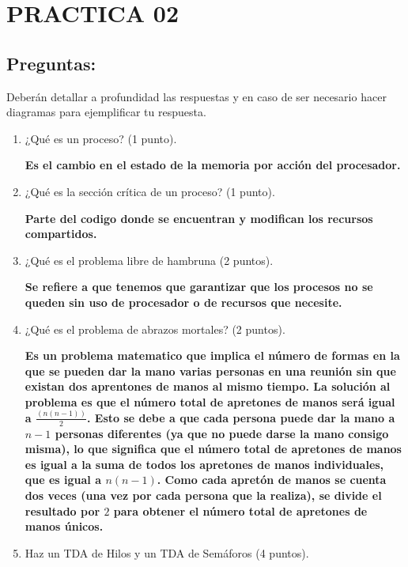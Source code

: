 \documentclass[12pt]{article}
\begin{document}

{\color{red} \section*{\textbf{PRACTICA 02}}}
\vspace{1em}

{\color{blue} \subsection*{\textbf{Preguntas:}}}


Deberán detallar a profundidad las respuestas y en caso de ser necesario hacer diagramas 
para ejemplificar tu respuesta.\\


\begin{enumerate}
    \item ¿Qué es un proceso? (1 punto).
    \vspace{2mm}
    
    \textbf{Es el cambio en el estado de la memoria por acción del procesador.}
    \item ¿Qué es la sección crítica de un  proceso? (1 punto).
    \vspace{2mm}
    
    \textbf{Parte del codigo donde se encuentran y modifican los recursos compartidos.}
    \item ¿Qué es el problema libre de hambruna (2 puntos).
    \vspace{2mm}
    
    \textbf{Se refiere a que tenemos que garantizar que los procesos no se queden sin uso de procesador o de recursos que necesite.}
    \item ¿Qué es el problema de abrazos mortales? (2 puntos).
    \vspace{2mm}
    
    \textbf{Es un problema matematico que implica el número de formas en la que se pueden dar la mano varias personas en una reunión sin que existan dos
    aprentones de manos al mismo tiempo. La solución al problema es que el número total de apretones de manos será igual a $\frac{(n(n-1))}{2}$. Esto se debe a que 
    cada persona puede dar la mano a $n-1$ personas diferentes (ya que no puede darse la mano consigo misma), lo que significa que el número total de apretones de manos 
    es igual a la suma de todos los apretones de manos individuales, que es igual a $n(n-1)$. Como cada apretón de manos se cuenta dos veces (una vez por cada persona que la realiza), 
    se divide el resultado por $2$ para obtener el número total de apretones de manos únicos.}
    \item Haz un TDA de Hilos y  un TDA de Semáforos (4 puntos).
    \vspace{2mm}
    

\end{enumerate}
\end{document}
